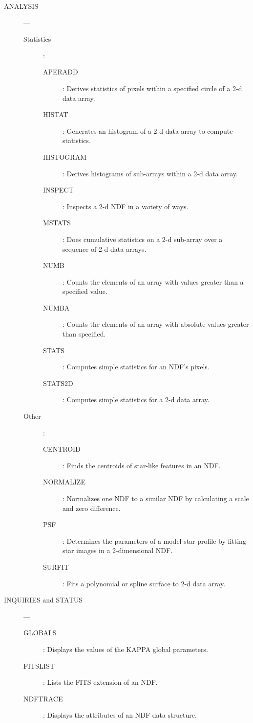 {\begin{small}
\begin{description}
\item [ANALYSIS] ---
\begin{description}
\item [Statistics]:
\begin{description}
\item [APERADD]:
 Derives statistics of pixels within a specified circle of a 2-d data array.
\item [HISTAT]:
 Generates an histogram of a 2-d data array to compute statistics.
\item [HISTOGRAM]:
 Derives histograms of sub-arrays within a 2-d data array.
\item [INSPECT]:
 Inspects a 2-d NDF in a variety of ways.
\item [MSTATS]:
 Does cumulative statistics on a 2-d sub-array over a sequence of 2-d data
 arrays.
\item [NUMB]:
 Counts the elements of an array with values greater than a specified value.
\item [NUMBA]:
 Counts the elements of an array with absolute values greater than specified.
\item [STATS]:
 Computes simple statistics for an NDF's pixels.
\item [STATS2D]:
 Computes simple statistics for a 2-d data array.
\end{description}
\item [Other]:
\begin{description}
\item [CENTROID]:
 Finds the centroids of star-like features in an NDF.
\item [NORMALIZE]:
 Normalizes one NDF to a similar NDF by calculating a
 scale and zero difference.
\item [PSF]:
 Determines the parameters of a model star profile by
 fitting star images in a 2-dimensional NDF.
\item [SURFIT]:
 Fits a polynomial or spline surface to 2-d data array.
\end {description}
\end {description}

\item [INQUIRIES and STATUS] ---
\begin {description}
\begin {description}
\item [GLOBALS]:
 Displays the values of the {\small KAPPA} global parameters.
\item [FITSLIST]:
 Lists the FITS extension of an NDF.
\item [NDFTRACE]:
 Displays the attributes of an NDF data structure.
\end {description}
\end {description}


\end{description}
\end{small}}
